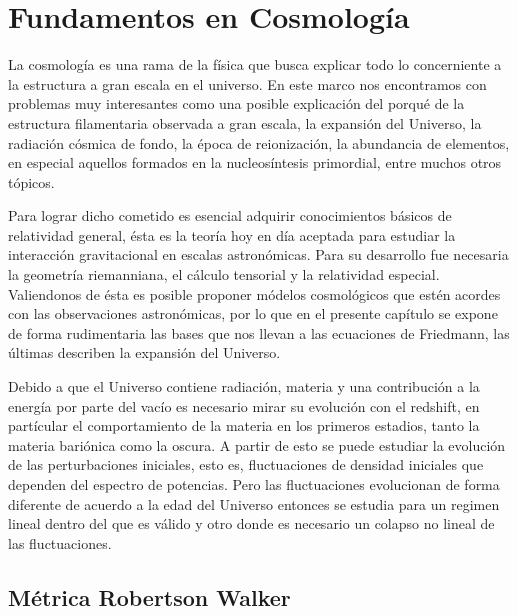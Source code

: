 \chapter{Fundamentos en Cosmología }\label{chap:marco}

La cosmología es una rama de la física que busca explicar todo lo 
concerniente a la estructura a gran escala en el universo. En este 
marco nos encontramos con problemas muy interesantes como una posible 
explicación del porqué de la estructura filamentaria observada a 
gran escala, la expansión del Universo, la radiación cósmica de fondo, 
la época de reionización, la abundancia de elementos, en especial 
aquellos formados en la nucleosíntesis primordial, entre muchos otros 
tópicos. 

Para lograr dicho cometido es esencial adquirir conocimientos básicos 
de relatividad ge\-ne\-ral, ésta es la teoría hoy en día aceptada para 
estudiar la interacción gravitacional en escalas astronómicas. 
Para su desarrollo fue necesaria la geometría riemanniana, el 
cálculo tensorial y la relatividad especial. 
Valiendonos de ésta es posible proponer módelos cosmológicos que estén 
acordes con las observaciones astronómicas, por lo que en el presente 
capítulo se expone de forma rudimentaria las bases que nos llevan a las 
ecuaciones de Friedmann, las últimas describen la expansión del Universo.
 
Debido a que el Universo contiene radiación, materia y una contribución 
a la energía por parte del vacío es necesario mirar su evolución con el 
redshift, en partícular el comportamiento de la materia en los primeros 
estadios, tanto la materia bariónica como la oscura.  
A partir de esto se puede estudiar la evolución de las perturbaciones iniciales, esto es, 
fluctuaciones de densidad iniciales que dependen del espectro de 
potencias. Pero las fluctuaciones evolucionan de forma diferente de acuerdo
a la edad del Universo entonces se estudia para un regimen lineal dentro del 
que es válido y otro donde es necesario un colapso no lineal de las fluctuaciones.




\section{M\'etrica Robertson Walker}

